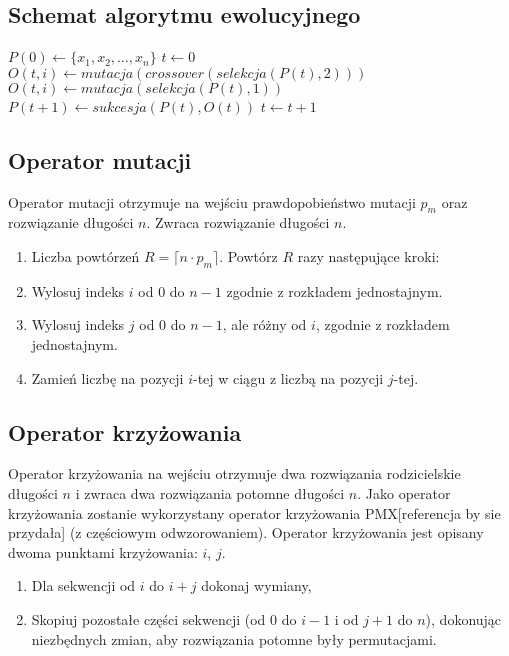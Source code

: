 \documentclass[12pt, a4paper]{article}
\begin{document}
\subsection{Schemat algorytmu ewolucyjnego}

\begin{algorithm}[!htb]
\label{ea}
\begin{algorithmic}[1]
	\State $P(0) \gets \{x_1, x_2, \ldots, x_n\}$
	\State $t \gets 0$
    			\State $O(t,i) \gets mutacja(crossover(selekcja(P(t), 2)))$
    		\Else
    			\State $O(t,i) \gets mutacja(selekcja(P(t),1))$
    		\EndIf
    	\EndFor
    \State $P(t+1) \gets sukcesja(P(t),O(t))$
    \State $t \gets t+1$
  	\EndWhile
\EndFunction
\end{algorithmic}
\end{algorithm}

\subsection{Operator mutacji}

Operator mutacji otrzymuje na wejściu prawdopobieństwo mutacji $p_m$ oraz rozwiązanie długości $n$.
Zwraca rozwiązanie długości $n$.

\begin{enumerate}
 \item Liczba powtórzeń $R = \lceil n \cdot  p_m \rceil$. Powtórz $R$ razy następujące kroki:
 \item Wylosuj indeks $i$ od 0 do $n-1$ zgodnie z rozkładem jednostajnym.
 \item Wylosuj indeks $j$ od 0 do $n-1$, ale różny od $i$, zgodnie z rozkładem jednostajnym.
 \item Zamień liczbę na pozycji $i$-tej w ciągu z liczbą na pozycji $j$-tej.
\end{enumerate}

\subsection{Operator krzyżowania}

Operator krzyżowania na wejściu otrzymuje dwa rozwiązania rodzicielskie długości $n$ i zwraca dwa rozwiązania potomne długości $n$. 
Jako operator krzyżowania zostanie wykorzystany operator krzyżowania {PMX}[referencja by sie przydała] (z częściowym odwzorowaniem).
Operator krzyżowania jest opisany dwoma punktami krzyżowania: $i$, $j$.
\begin{enumerate}
 \item Dla sekwencji od $i$ do $i+j$ dokonaj wymiany, %
 \item Skopiuj pozostałe części sekwencji (od $0$ do $i-1$ i od $j+1$ do $n$), dokonując niezbędnych zmian, aby rozwiązania potomne były permutacjami.
\end{enumerate}
\end{document}
